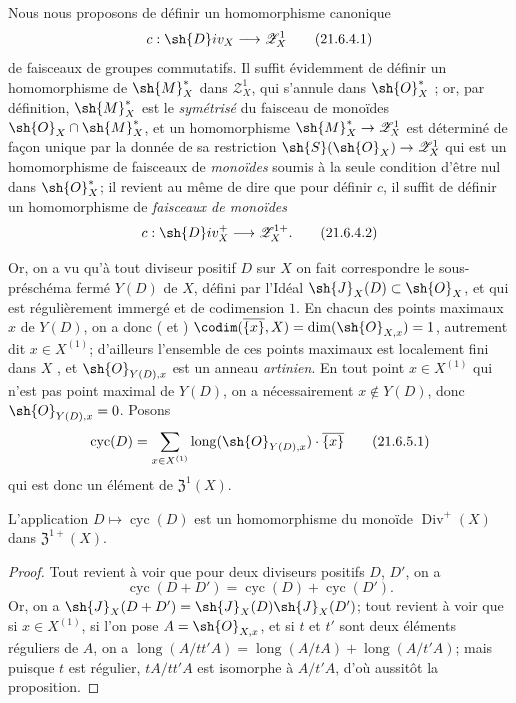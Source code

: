 \begin{env}[21.6.4]
\label{IV.21.6.4}
Nous nous proposons de définir un homomorphisme canonique
\[
\label{IV.21.6.4.1}
  c:\sh{D}iv_X\to\mathscr{Z}_X^1
  \tag{21.6.4.1}
\]
de faisceaux de groupes commutatifs.
Il suffit évidemment de définir un homomorphisme de $\sh{M}_X^*$ dans $\mathscr{Z}_X^1$, qui s'annule dans $\sh{O}_X^*$ ;
or, par définition, $\sh{M}_X^*$ est le \emph{symétrisé} du faisceau de monoïdes $\sh{O}_X\cap\sh{M}_X^*$, et un homomorphisme $\sh{M}_X^*\to\mathscr{Z}_X^1$ est déterminé de façon unique par la donnée de sa restriction $\sh{S}(\sh{O}_X)\to\mathscr{Z}_X^1$ qui est un homomorphisme de faisceaux de \emph{monoïdes} soumis à la seule condition d'être nul dans $\sh{O}_X^*$;
il revient au même de dire que pour définir $c$, il suffit de définir un homomorphisme de \emph{faisceaux de monoïdes}
\[
\label{IV.21.6.4.2}
  c:\sh{D}iv_X^+\to\mathscr{Z}_X^{1+}.
  \tag{21.6.4.2}
\]
\end{env}

\begin{env}[21.6.5]
\label{IV.21.6.5}
Or, on a vu qu'à tout diviseur positif $D$ sur $X$ on fait correspondre le sous-préschéma fermé $Y(D)$ de $X$, défini par l'Idéal $\sh{J}_X(D)\subset\sh{O}_X$, et qui est régulièrement immergé et de codimension $1$.
En chacun des points maximaux $x$ de $Y(D)$, on a donc ( et ) $\codim(\overline{\{x\}},X)=\dim(\sh{O}_{X,x})=1$, autrement dit $x\in X^{(1)}$;
d'ailleurs l'ensemble de ces points maximaux est localement fini dans $X$ , et $\sh{O}_{Y(D),x}$ est un anneau \emph{artinien}.
En tout point $x\in X^{(1)}$ qui n'est pas point maximal de $Y(D)$, on a nécessairement $x\notin Y(D)$, donc $\sh{O}_{Y(D),x}=0$.
Posons
\[
\label{IV.21.6.5.1}
  \operatorname{cyc}(D)=\sum_{x\in X^{(1)}}\operatorname{long}(\sh{O}_{Y(D),x})\cdot\overline{\{x\}}
  \tag{21.6.5.1}
\]
qui est donc un élément de $\mathfrak{Z}^1(X)$.
\end{env}

\begin{proposition}[21.6.6]
\label{IV.21.6.6}
L'application $D\mapsto\operatorname{cyc}(D)$ est un homomorphisme du monoïde $\operatorname{Div}^+(X)$ dans $\mathfrak{Z}^{1+}(X)$.
\end{proposition}

\begin{proof}
Tout revient à voir que pour deux diviseurs positifs $D$, $D'$, on a
\[
  \operatorname{cyc}(D+D')=\operatorname{cyc}(D)+\operatorname{cyc}(D').
\]
Or, on a  $\sh{J}_X(D+D')=\sh{J}_X(D)\sh{J}_X(D')$;
tout revient à voir que si $x\in X^{(1)}$, si l'on pose $A=\sh{O}_{X,x}$, et si $t$ et $t'$ sont deux éléments réguliers de $A$, on a $\operatorname{long}(A/tt'A)=\operatorname{long}(A/tA)+\operatorname{long}(A/t'A)$;
mais puisque $t$ est régulier, $tA/tt'A$ est isomorphe à $A/t'A$, d'où aussitôt la proposition.
\end{proof}

